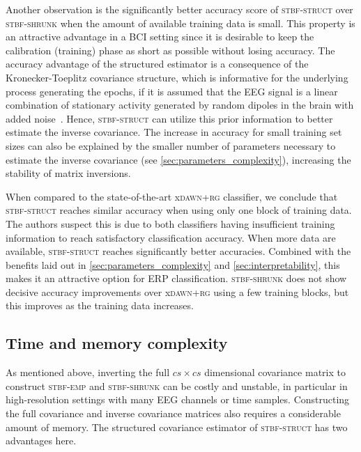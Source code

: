 \begin{refsection}
	Another observation is the significantly better accuracy score of
	\textsc{stbf-struct} over \textsc{stbf-shrunk} when the amount of available training data is small.
	This property is an attractive advantage in a BCI setting since it is desirable to keep the calibration (training) phase as short as possible without losing accuracy.
	The accuracy advantage of the structured estimator is a consequence of the
	Kronecker-Toeplitz covariance structure, which is informative for the
	underlying process generating the epochs, if it is assumed that the EEG signal
	is a linear combination of stationary activity generated by random dipoles in
	the brain with added noise~\cite{Munck1992, DeMunck2002, GonzalezNavarro2017}.
	Hence, \textsc{stbf-struct} can utilize this prior information to better estimate the inverse
	covariance.
	The increase in accuracy for small training set sizes can also be explained by the smaller number of parameters necessary to estimate the inverse covariance (see \autoref{sec:parameters_complexity}), increasing the stability of matrix inversions.

	When compared to the state-of-the-art x\textsc{dawn+rg} classifier, we conclude
	that \textsc{stbf-struct} reaches similar accuracy when using only one block of
	training data.
	The authors suspect this is due to both
	classifiers having insufficient training information to reach
	satisfactory classification accuracy.
	When more data are available, \textsc{stbf-struct} reaches significantly better accuracies.
	Combined with the benefits laid out in  \autoref{sec:parameters_complexity} and
	\autoref{sec:interpretability}, this makes it an attractive option for ERP classification.
	\textsc{stbf-shrunk} does not show decisive accuracy improvements over
	x\textsc{dawn+rg} using a few training blocks, but this improves as the training data increases.

	\subsection{Time and memory complexity}
	\label{sec:parameters_complexity}
	As mentioned above, inverting the full $cs \times cs$ dimensional covariance
	matrix to construct \textsc{stbf-emp} and \textsc{stbf-shrunk} can be costly
	and unstable, in particular in high-resolution settings with many EEG channels or time samples.
	Constructing the full covariance and inverse covariance matrices also requires a considerable amount of memory.
	The structured covariance estimator of \textsc{stbf-struct} has two advantages here.


\end{refsection}
